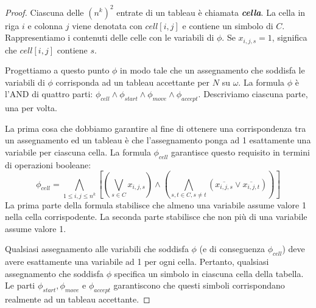 \documentclass[12pt]{report}
\begin{document}
\begin{proof}
	Ciascuna delle $\left(n^k\right)^2$ entrate di un tableau è chiamata \textbf{\textit{cella}}. La cella in riga $i$ e colonna $j$ viene denotata con $cell[i, j]$ e contiene un simbolo di $C$. Rappresentiamo i contenuti delle celle con le variabili di $\phi$. Se $x_{i, j, s} = 1$, significa che $cell[i, j]$ contiene $s$.

	Progettiamo a questo punto $\phi$ in modo tale che un assegnamento che soddisfa le variabili di $\phi$ corrisponda ad un tableau accettante per $N$ su $\omega$. La formula $\phi$ è l'AND di quattro parti: $\phi_{cell} \wedge \phi_{start} \wedge \phi_{move} \wedge \phi_{accept}$. Descriviamo ciascuna parte, una per volta.

	La prima cosa che dobbiamo garantire al fine di ottenere una corrispondenza tra un assegnamento ed un tableau è che l'assegnamento ponga ad 1 esattamente una variabile per ciascuna cella. La formula $\phi_{cell}$ garantisce questo requisito in termini di operazioni booleane:
	\[
	\phi_{cell} = \bigwedge_{1 \leq i,j\leq n^k}\left[\left(\bigvee_{s \in C}x_{i, j, s}\right) \wedge \left(\bigwedge_{s, t \in C, s \neq t}(\overline{x_{i, j, s}} \vee \overline{x_{i, j, t}})\right)\right]
	\]
	La prima parte della formula stabilisce che almeno una variabile assume valore 1 nella cella corrispodente. La seconda parte stabilisce che non più di una variabile assume valore 1.

	Qualsiasi assegnamento alle variabili che soddisfa $\phi$ (e di conseguenza $\phi_{cell}$) deve avere esattamente una variabile ad 1 per ogni cella. Pertanto, qualsiasi assegnamento che soddisfa $\phi$ specifica un simbolo in ciascuna cella della tabella. Le parti $\phi_{start}, \phi_{move}$ e $\phi_{accept}$ garantiscono che questi simboli corrispondano realmente ad un tableau accettante.


\end{proof}
\end{document}
